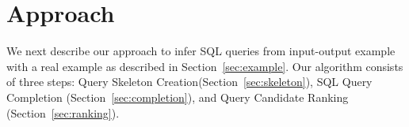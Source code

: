 
\section{Approach}
\label{sec:approach}



We next describe our approach to infer SQL queries from 
input-output example with a real example as described
in Section~\ref{sec:example}. Our algorithm consists of three steps:
Query Skeleton Creation(Section~\ref{sec:skeleton}),
SQL Query Completion (Section~\ref{sec:completion}), and
Query Candidate Ranking (Section~\ref{sec:ranking}).






